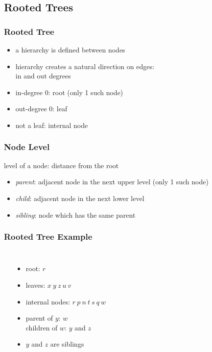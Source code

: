 \documentclass[dvipsnames]{beamer}
\begin{document}
\subsection{Rooted Trees}

\begin{frame}
  \frametitle{Rooted Tree}

  \begin{itemize}
    \item a hierarchy is defined between nodes
    \item hierarchy creates a natural direction on edges:\\
      in and out degrees

    \pause
    \medskip
    \item in-degree 0: \alert{root} (only 1 such node)
    \item out-degree 0: \alert{leaf}
    \item not a leaf: \alert{internal} node
  \end{itemize}
\end{frame}

\begin{frame}
  \frametitle{Node Level}

  \begin{definition}
    \alert{level} of a node: distance from the root
  \end{definition}

  \begin{itemize}
    \item \emph{parent}: adjacent node in the next upper level (only 1 such node)
    \item \emph{child}: adjacent node in the next lower level
    \item \emph{sibling}: node which has the same parent
  \end{itemize}
\end{frame}

\begin{frame}
  \frametitle{Rooted Tree Example}

  \begin{example}
    \begin{columns}
      \begin{center}
      \end{center}

      \begin{itemize}
        \item root: $r$
        \item leaves: $x ~ y ~ z ~ u ~ v$
        \item internal nodes: $r ~ p ~ n ~ t ~ s ~ q ~ w$
        \item parent of $y$: $w$\\
          children of $w$: $y$ and $z$\\
	\item $y$ and $z$ are siblings
      \end{itemize}
    \end{columns}
  \end{example}
\end{frame}
\end{document}
